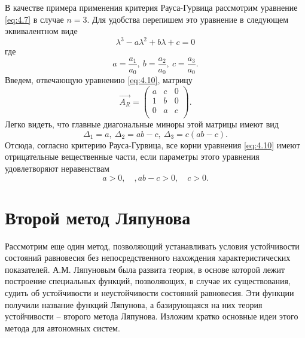 В качестве примера применения критерия Рауса-Гурвица рассмотрим уравнение \eqref{eq:4.7} в случае $n=3$. Для удобства перепишем это уравнение в следующем эквивалентном виде
\begin{equation}
        \label{eq:4.10}
        \lambda^3 - a \lambda^2 + b \lambda +c =0
\end{equation}
где
\begin{equation}
        \label{eq:}
        a= \frac{a_1}{a_0}, ~ b= \frac{a_2}{a_0}, ~ c= \frac{a_3}{a_0}.
\end{equation}
Введем, отвечающую уравнению \eqref{eq:4.10}, матрицу
\begin{equation}
        \label{eq:}
        \vec{A_R} = 
        \begin{pmatrix}
                a & c & 0 \\
                1 & b & 0 \\
                0 & a & c \\    
        \end{pmatrix}
        .
\end{equation}
Легко видеть, что главные диагональные миноры этой матрицы имеют вид
\begin{equation}
        \label{eq:4.11}
        \Delta_1 = a, ~ \Delta_2 = ab - c, ~ \Delta_3= c(ab-c).
\end{equation}
Отсюда, согласно критерию Рауса-Гурвица, все корни уравнения \eqref{eq:4.10} имеют отрицательные вещественные части, если параметры этого уравнения удовлетворяют неравенствам
\begin{equation}
        \label{eq:4.12}
        a>0, \quad, ab-c>0, \quad c>0.
\end{equation}

\section{Второй метод Ляпунова}%
\label{sec:4.3}

Рассмотрим еще один метод, позволяющий устанавливать условия
устойчивости состояний равновесия без непосредственного нахождения
характеристических показателей. А.М. Ляпуновым была развита теория, в
основе которой лежит построение специальных функций, позволяющих, в
случае их существования, судить об устойчивости и неустойчивости состояний
равновесия. Эти функции получили название функций Ляпунова, а
базирующаяся на них теория устойчивости -- второго метода Ляпунова.
Изложим кратко основные идеи этого метода для автономных систем.

